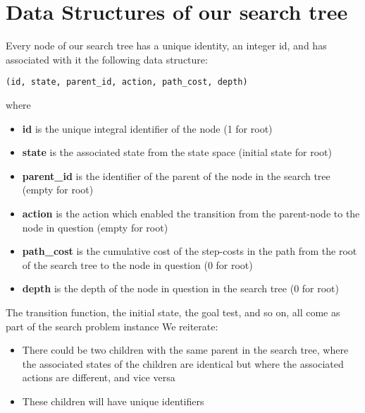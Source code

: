\documentclass{article}[18pt]
\begin{document}
\section{Data Structures of our search tree}
Every node of our search tree has a unique identity, an integer id, and has associated with it the following data structure:
\begin{center}
	\texttt{(id, state, parent\_id, action, path\_cost, depth)}
\end{center}
where
\begin{itemize}
	\item \textbf{id} is the unique integral identifier of the node (1 for root)
	\item \textbf{state} is the associated state from the state space (initial state for root)
	\item \textbf{parent\_id} is the identifier of the parent of the node in the search tree (empty for root)
	\item \textbf{action} is the action which enabled the transition from the parent-node to the node in question (empty for root)
	\item \textbf{path\_cost} is the cumulative cost of the step-costs in the path from the root of the search tree to the node in question (0 for root)
	\item \textbf{depth} is the depth of the node in question in the search tree (0 for root)
\end{itemize}
The transition function, the initial state, the goal test, and so on, all come as part of the search problem instance
We reiterate:
\begin{itemize}
	\item There could be two children with the same parent in the search tree, where the associated states of the children are identical but where the associated actions are different, and vice versa
	\item These children will have unique identifiers
\end{itemize}
\end{document}
